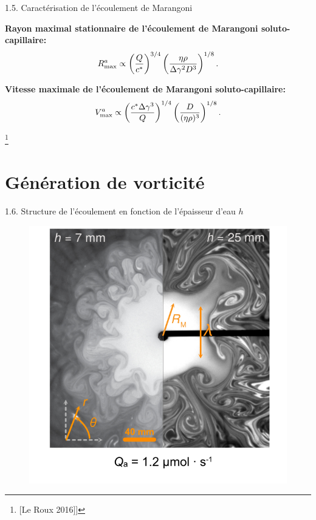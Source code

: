 \documentclass[aspectratio=169,10pt]{beamer}
\begin{document}

    \begin{frame}{1.5. Caractérisation de l'écoulement de Marangoni}
        \begin{ombredef}
            \begin{defi}
              \noindent\textbf{Rayon maximal stationnaire de l'écoulement de Marangoni soluto-capillaire:}\bigskip
                \begin{equation}
                    R_{\rm max}^{a} \propto \left(\frac{Q}{c^{*}}\right)^{3/4}\left(\frac{\eta\rho}{\Delta\gamma^2 D^3}\right)^{1/8}.
                \end{equation}
          
                \noindent \textbf{Vitesse maximale de l'écoulement de Marangoni soluto-capillaire:}\bigskip
                \begin{equation}
                V_{\rm max}^{a}\propto\left(\frac{c^{*}\Delta\gamma^3}{Q}\right)^{1/4}\left(\frac{D}{(\eta\rho)^3}\right)^{1/8}.
                \end{equation}
          \end{defi}
        \end{ombredef}
        \footnote{[Le Roux 2016]]} 
    \end{frame}


    \section{Génération de vorticité}

\begin{frame}{1.6. Structure de l'écoulement en fonction de l'épaisseur d'eau $h$}
    \begin{figure}
        \centering
        \includegraphics[width = .5\textwidth]{./figures/Marangoni_flow_emulsion_Qa1p2mumolL_h7mm_h25mm.png}
    \end{figure}    
\end{frame}
\end{document}
